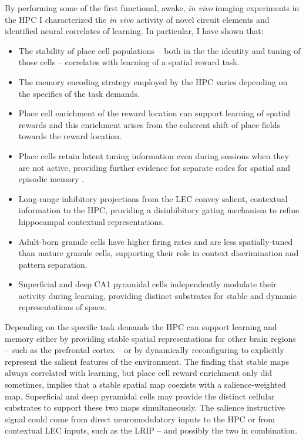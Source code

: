 By performing some of the first functional, awake, \emph{in vivo} imaging experiments in the \ac{HPC} I characterized the \emph{in vivo} activity of novel circuit elements and identified neural correlates of learning.
In particular, I have shown that:
\begin{itemize}
	\item The stability of place cell populations -- both in the the identity and tuning of those cells -- correlates with learning of a spatial reward task.
	\item The memory encoding strategy employed by the \ac{HPC} varies depending on the specifics of the task demands.
	\item Place cell enrichment of the reward location can support learning of spatial rewards and this enrichment arises from the coherent shift of place fields towards the reward location.
	\item Place cells retain latent tuning information even during sessions when they are not active, providing further evidence for separate codes for spatial and episodic memory \citep{Leutgeb2005a}.
	\item Long-range inhibitory projections from the \ac{LEC} convey salient, contextual information to the \ac{HPC}, providing a disinhibitory gating mechanism to refine hippocampal contextual representations.
	\item Adult-born granule cells have higher firing rates and are less spatially-tuned than mature granule cells, supporting their role in context discrimination and pattern separation.
	\item Superficial and deep CA1 pyramidal cells independently modulate their activity during learning, providing distinct substrates for stable and dynamic representations of space.
\end{itemize}

Depending on the specific task demands the \ac{HPC} can support learning and memory either by providing stable spatial representations for other brain regions -- such as the prefrontal cortex -- or by dynamically reconfiguring to explicitly represent the salient features of the environment. 
The finding that stable maps always correlated with learning, but place cell reward enrichment only did sometimes, implies that a stable spatial map coexists with a salience-weighted map. Superficial and deep pyramidal cells may provide the distinct cellular substrates to support these two maps simultaneously. The salience instructive signal could come from direct neuromodulatory inputs to the \ac{HPC} or from contextual \ac{LEC} inputs, such as the \ac{LRIP} -- and possibly the two in combination.

